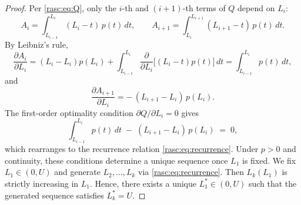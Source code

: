 \begin{proof}
Per \eqref{rasc:eq:Q}, only the $i$-th and $(i+1)$-th terms of $Q$ depend on $L_i$:
\[
A_i=\int_{L_{i-1}}^{L_i} (L_i-t)\,p(t)\,dt,\qquad
A_{i+1}=\int_{L_i}^{L_{i+1}} (L_{i+1}-t)\,p(t)\,dt.
\]
By Leibniz's rule,
\[
\frac{\partial A_i}{\partial L_i}
= (L_i{-}L_i)p(L_i) + \int_{L_{i-1}}^{L_i} \frac{\partial}{\partial L_i}\big[(L_i{-}t)p(t)\big]\,dt
= \int_{L_{i-1}}^{L_i} p(t)\,dt,
\]
and
\[
\frac{\partial A_{i+1}}{\partial L_i}
= -\,(L_{i+1}-L_i)\,p(L_i).
\]
The first-order optimality condition $\partial Q/\partial L_i=0$ gives
\[
\int_{L_{i-1}}^{L_i} p(t)\,dt \;-\; (L_{i+1}-L_i)\,p(L_i) \;=\;0,
\]
which rearranges to the recurrence relation \eqref{rasc:eq:recurrence}.
Under $p>0$ and continuity, 
these conditions determine a unique sequence once $L_1$ is fixed.
We fix $L_1\in(0,U)$ and generate $L_2,\dots,L_k$ via \eqref{rasc:eq:recurrence}.
Then $L_k(L_1)$ is strictly increasing in $L_1$.
Hence, there exists a unique $L_1^*\in(0,U)$ such that the generated sequence satisfies
$L_k^*=U$.
\end{proof}

